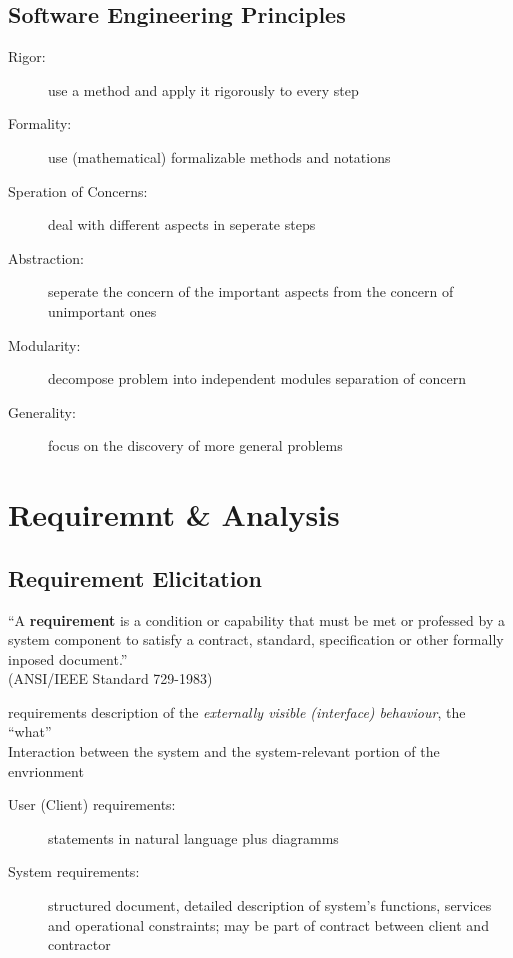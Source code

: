 \documentclass[a4paper, 10pt]{article}
\begin{document}
\subsection*{Software Engineering Principles}
\begin{description}
	\item[Rigor:] use a method and apply it rigorously to every step
	\item[Formality:] use (mathematical) formalizable methods and notations
	\item[Speration of Concerns:] deal with different aspects in seperate steps
	\item[Abstraction:] seperate the concern of the important aspects from the concern of unimportant ones
	\item[Modularity:] decompose problem into independent modules \follows separation of concern
	\item[Generality:] focus on the discovery of more general problems
\end{description}

\section*{Requiremnt \& Analysis}

\subsection*{Requirement Elicitation}
\begin{shaded}
``A \textbf{requirement} is a condition or capability that must be met or professed by a system component to satisfy a contract, standard, specification or other formally inposed document.'' \\
(ANSI/IEEE Standard 729-1983)
\end{shaded}
requirements \follows description of the \emph{externally visible (interface) behaviour}, the ``what''\\
Interaction between the system and the system-relevant portion of the envrionment

\begin{description}
	\item[User (Client) requirements:] statements in natural language plus diagramms
	\item[System requirements:] structured document, detailed description of system's functions, services and operational constraints; may be part of contract between client and contractor
\end{description}
\end{document}
